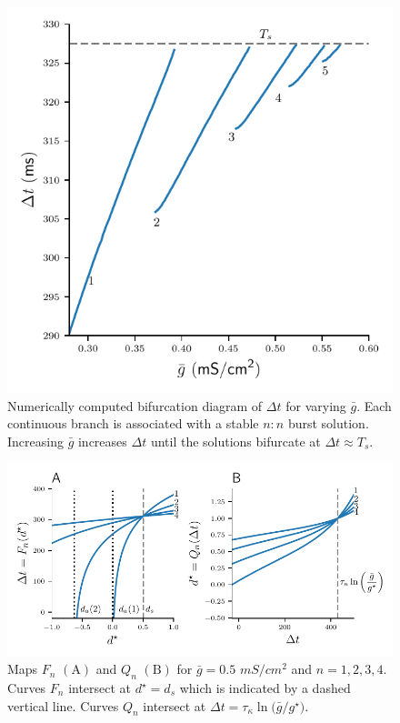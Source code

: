 \documentclass[utf8]{frontiersFPHY} %
\newcommand{\delt}{\Delta t}
\begin{document}
\begin{figure}[h!]
	\centering
	\includegraphics{delta-t}
	\caption{Numerically computed bifurcation diagram of $\delt$ for varying $\bar g$.
		Each continuous branch is associated with a stable $n:n$ burst solution. Increasing
		$\bar g$ increases $\Delta t$ until the solutions bifurcate at $\Delta t\approx
			T_{s}$.~\label{fig:delta-t}}
\end{figure}

\begin{figure}[h!]
	\centering
	\includegraphics{FQ-maps}
	\caption{Maps $F_n$ $\bm{\mathrm{(A)}}$ and $Q_n$ $\bm{\mathrm{(B)}}$ for
	$\bar g=0.5$ $\si{mS/cm^{2}}$ and $n=1,2,3,4$. Curves $F_n$ intersect at
	$d^{\star}=d_{s}$ which is indicated by a dashed vertical line. Curves $Q_n$ intersect at $\Delta t = \tau_{\kappa}\ln\Big(\bar g / g^{\star}\Big)$. \label{fig:FQ-maps}}
\end{figure}
\end{document}
